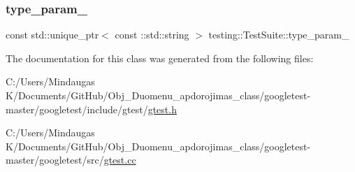 \mbox{\label{classtesting_1_1_test_suite_a3aa1b3a0435ef55e33a36d0e241484f1}} 
\subsubsection{\texorpdfstring{type\_param\_}{type\_param\_}}
{\footnotesize\ttfamily const std\+::unique\+\_\+ptr$<$ const \+::std\+::string $>$ testing\+::\+Test\+Suite\+::type\+\_\+param\+\_\+\hspace{0.3cm}{\ttfamily [private]}}



The documentation for this class was generated from the following files\+:\begin{DoxyCompactItemize}
\item 
C\+:/\+Users/\+Mindaugas K/\+Documents/\+Git\+Hub/\+Obj\+\_\+\+Duomenu\+\_\+apdorojimas\+\_\+class/googletest-\/master/googletest/include/gtest/\mbox{\hyperlink{googletest-master_2googletest_2include_2gtest_2gtest_8h}{gtest.\+h}}\item 
C\+:/\+Users/\+Mindaugas K/\+Documents/\+Git\+Hub/\+Obj\+\_\+\+Duomenu\+\_\+apdorojimas\+\_\+class/googletest-\/master/googletest/src/\mbox{\hyperlink{googletest-master_2googletest_2src_2gtest_8cc}{gtest.\+cc}}\end{DoxyCompactItemize}
